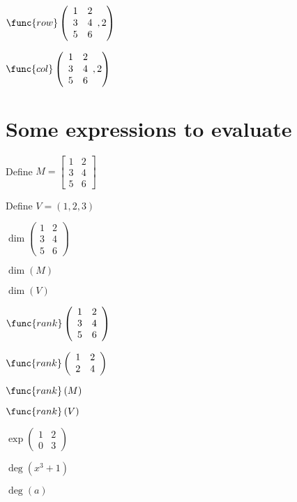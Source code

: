 \documentclass{article}
\begin{document}
$\func{row}\left( 
\begin{array}{cc}
1 & 2 \\ 
3 & 4 \\ 
5 & 6%
\end{array}%
,2\right) $

$\func{col}\left( 
\begin{array}{cc}
1 & 2 \\ 
3 & 4 \\ 
5 & 6%
\end{array}%
,2\right) $

\section{Some expressions to evaluate}

Define $M=\left[ 
\begin{array}{cc}
1 & 2 \\ 
3 & 4 \\ 
5 & 6%
\end{array}%
\right] $

Define $V=\left( 1,2,3\right) $

$\dim \left( 
\begin{array}{cc}
1 & 2 \\ 
3 & 4 \\ 
5 & 6%
\end{array}%
\right) $

$\dim \left( M\right) $

$\dim (V)$

$\func{rank}\left( 
\begin{array}{cc}
1 & 2 \\ 
3 & 4 \\ 
5 & 6%
\end{array}%
\right) $

$\func{rank}\left( 
\begin{array}{cc}
1 & 2 \\ 
2 & 4%
\end{array}%
\right) $

$\func{rank}\left( M\right) $

$\func{rank}\left( V\right) $

$\exp \left( 
\begin{array}{cc}
1 & 2 \\ 
0 & 3%
\end{array}%
\right) $

$\deg \left( x^{3}+1\right) $

$\deg \left( a\right) $
\end{document}
